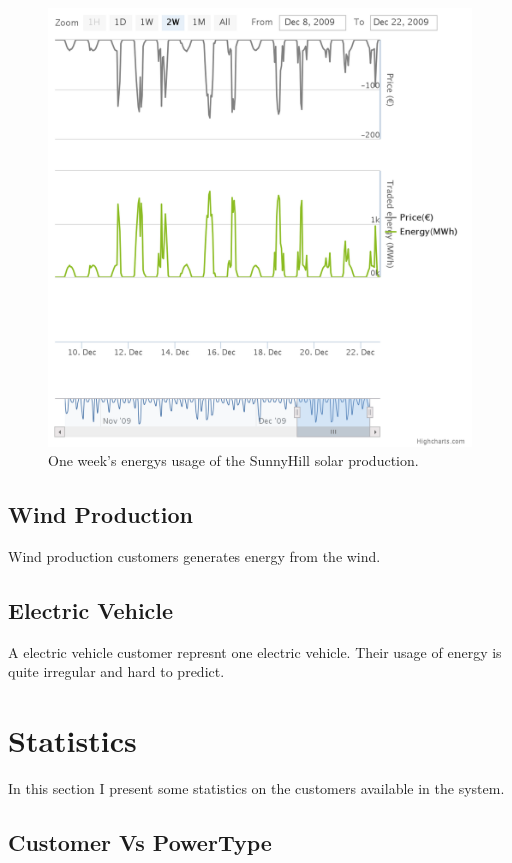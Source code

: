 \begin{figure}[h!]
  \includegraphics[width=\linewidth]{sunnyhill-oneweek.png}
  \caption{One week's energys usage of the SunnyHill solar production.}
  \label{fig:solar-oneweek}
\end{figure}

\subsection{Wind Production}
Wind production customers generates energy from the wind.
\subsection {Electric Vehicle}
A electric vehicle customer represnt one electric vehicle. Their usage of energy is quite irregular and hard to predict.

\section{Statistics}
In this section I present some statistics on the customers available in the system. 

\subsection {Customer Vs PowerType}

